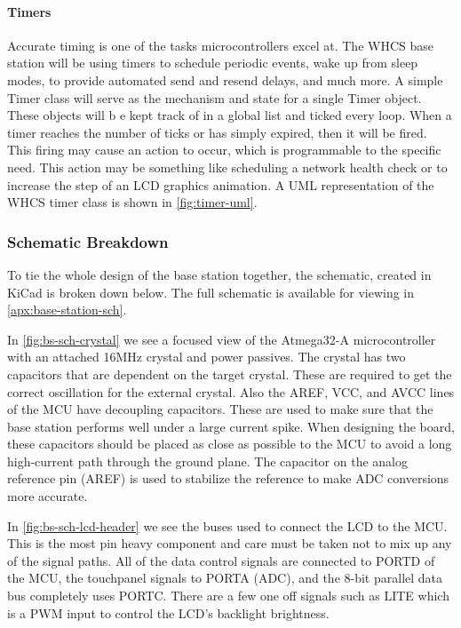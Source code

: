 \paragraph{Timers}
Accurate timing is one of the tasks microcontrollers excel at. The WHCS base
station will be using timers to schedule periodic events, wake up from sleep
modes, to provide automated send and resend delays, and much more. A simple
Timer class will serve as the mechanism and state for a single Timer object.
These objects will b e kept track of in a global list and ticked every loop.
When a timer reaches the number of ticks or has simply expired, then it will be
fired. This firing may cause an action to occur, which is programmable to the
specific need. This action may be something like scheduling a network health
check or to increase the step of an LCD graphics animation. A UML representation of the WHCS timer class is shown in \autoref{fig:timer-uml}.


\subsubsection{Schematic Breakdown}
To tie the whole design of the base station together, the schematic, created in KiCad is broken down below. The full schematic is available for viewing in \autoref{apx:base-station-sch}.

In \autoref{fig:bs-sch-crystal} we see a focused view of the Atmega32-A
microcontroller with an attached 16MHz crystal and power passives. The crystal
has two capacitors that are dependent on the target crystal. These are required
to get the correct oscillation for the external crystal. Also the AREF, VCC,
and AVCC lines of the MCU have decoupling capacitors. These are used to make
sure that the base station performs well under a large current spike. When
designing the board, these capacitors should be placed as close as possible to
the MCU to avoid a long high-current path through the ground plane. The
capacitor on the analog reference pin (AREF) is used to stabilize the reference
to make ADC conversions more accurate.


In \autoref{fig:bs-sch-lcd-header} we see the buses used to connect the LCD to the
MCU. This is the most pin heavy component and care must be taken not to mix up
any of the signal paths. All of the data control signals are connected to PORTD
of the MCU, the touchpanel signals to PORTA (ADC), and the 8-bit parallel data
bus completely uses PORTC. There are a few one off signals such as LITE which
is a PWM input to control the LCD's backlight brightness.

